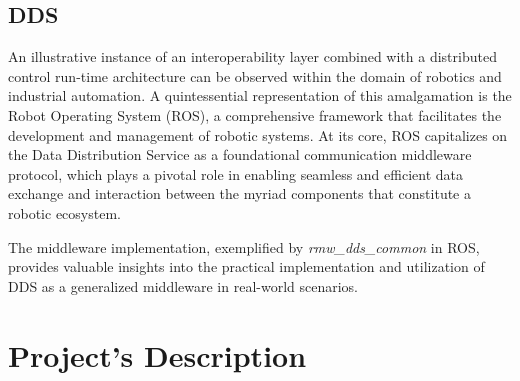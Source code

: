 \subsection{DDS}

An illustrative instance of an interoperability layer combined with a distributed control run-time architecture can be observed within the domain of robotics and industrial automation. A quintessential representation of this amalgamation is the Robot Operating System (ROS), a comprehensive framework that facilitates the development and management of robotic systems. At its core, ROS capitalizes on the Data Distribution Service as a foundational communication middleware protocol, which plays a pivotal role in enabling seamless and efficient data exchange and interaction between the myriad components that constitute a robotic ecosystem.

The middleware implementation, exemplified by \emph{rmw\_dds\_common} in ROS, provides valuable insights into the practical implementation and utilization of DDS as a generalized middleware in real-world scenarios.

\section{Project's Description} \label{SEC:pd}

